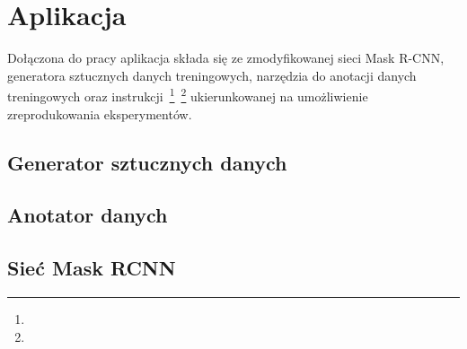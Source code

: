 \chapter{Aplikacja}

Dołączona do pracy aplikacja składa się ze zmodyfikowanej sieci Mask R-CNN, generatora sztucznych danych treningowych, narzędzia do anotacji danych treningowych oraz instrukcji~\footnote{}~\footnote{} ukierunkowanej na umożliwienie zreprodukowania eksperymentów.
\\

\section{Generator sztucznych danych}


\section{Anotator danych}


\section{Sieć Mask RCNN}

